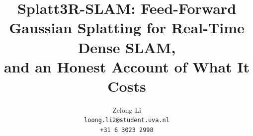\documentclass[10pt,twocolumn,letterpaper]{article}
\begin{document}
\title{Splatt3R-SLAM: Feed-Forward Gaussian Splatting for Real-Time Dense SLAM,\\
and an Honest Account of What It Costs}

\author{Zelong Li\\
{\tt\small loong.li2@student.uva.nl}\\
{\tt\small +31\,6\,3023\,2998}
}

\maketitle











{
    \small
    
    
}
\end{document}
